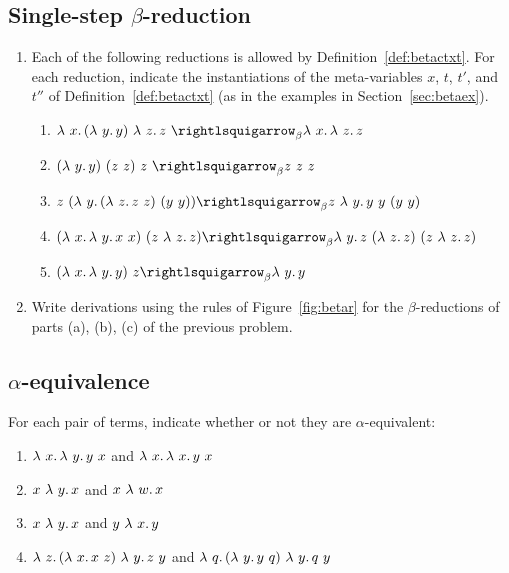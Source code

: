 \subsection{Single-step $\beta$-reduction}

\begin{enumerate}
  \item Each of the following reductions is allowed by Definition~\ref{def:betactxt}.  For each reduction, indicate the instantiations of the meta-variables $x$, $t$, $t'$, and $t''$ of Definition~\ref{def:betactxt} (as in the examples in Section~\ref{sec:betaex}).
    \begin{enumerate}
    \item $\lam{x}{(\lam{y}{y})\ \lam{z}{z}}\ \betar \lam{x}{\lam{z}{z}}$
      \vspace{.5cm}
    \item $(\lam{y}{y})\ (z\ z)\ z\ \betar z\ z\ z$
      \vspace{.5cm}
    \item $z\ (\lam{y}{(\lam{z}{z\ z})\ (y\ y)}) \betar z\ \lam{y}{y\ y\ (y\ y)}$
      \vspace{.5cm}
    \item $(\lam{x}{\lam{y}{x\ x}})\ (z\ \lam{z}{z}) \betar \lam{y}{z\ (\lam{z}{z})\ (z\ \lam{z}{z})}$
      \vspace{.5cm}
    \item $(\lam{x}{\lam{y}{y}})\ z \betar \lam{y}{y}$
      \vspace{.5cm}
    \end{enumerate}

  \item Write derivations using the rules of Figure~\ref{fig:betar} for the $\beta$-reductions of parts (a), (b), (c) of the previous problem.

   \end{enumerate}

\subsection{$\alpha$-equivalence}

For each pair of terms, indicate whether or not they are $\alpha$-equivalent:
\begin{enumerate}
\item $\lambda\ x.\, \lambda\ y.\, y\ x$ and $\lambda\ x.\, \lambda\ x.\, y\ x$
  \vspace{.5cm}
\item $x\ \lambda\ y.\, x$ and $x\ \lambda\ w.\, x$
  \vspace{.5cm}
\item $x\ \lambda\ y.\, x$ and $y\ \lambda\ x.\, y$
  \vspace{.5cm}
\item $\lam{z}{(\lam{x}{x\ z})\ \lam{y}{z\ y}}$ and $\lam{q}{(\lam{y}{y\ q})\ \lam{y}{q\ y}}$
  \vspace{.5cm}
\end{enumerate}

